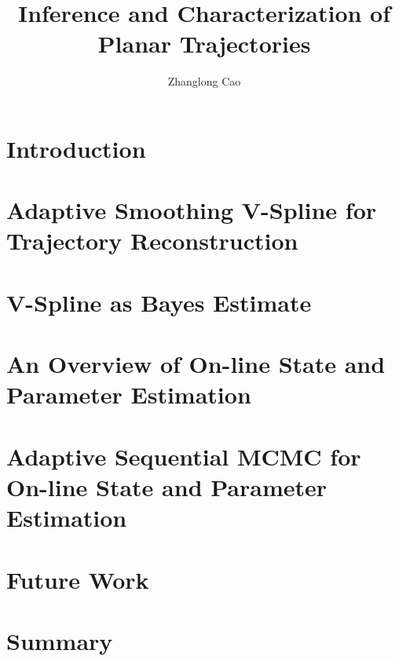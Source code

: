 \documentclass[12pt,twoside]{report}
\title{Inference and Characterization of Planar Trajectories}
\author{Zhanglong Cao}
\date{}
\begin{document}
\frontstuff

\linespread{1.3} \normalsize


\chapter{Introduction}\label{ChapterIntro}

\clearemptydoublepage

\chapter{Adaptive Smoothing V-Spline for Trajectory Reconstruction}\label{ChapterTS}

\clearemptydoublepage

\chapter{V-Spline as Bayes Estimate}\label{ChapterGPR}

\clearemptydoublepage

\chapter{An Overview of On-line State and Parameter Estimation}\label{ChapterFR}

\clearemptydoublepage

\chapter{Adaptive Sequential MCMC for On-line State and Parameter Estimation}\label{ChapterMCMC}

\clearemptydoublepage

%


\chapter{Future Work}\label{ChapterFuture}

\clearemptydoublepage


\chapter{Summary}\label{ChapterSummary}

\clearemptydoublepage
\end{document}
